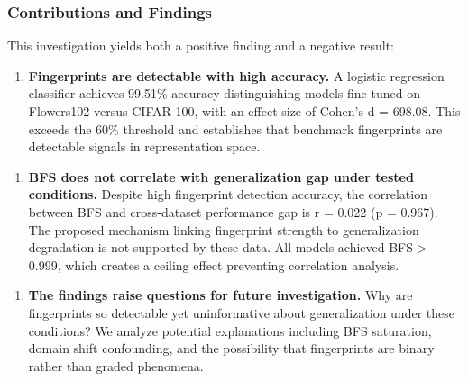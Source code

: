 \subsubsection{Contributions and Findings}

This investigation yields both a positive finding and a negative result:

\begin{enumerate}
\item \textbf{Fingerprints are detectable with high accuracy.} A logistic regression classifier achieves 99.51\% accuracy distinguishing models fine-tuned on Flowers102 versus CIFAR-100, with an effect size of Cohen's d = 698.08. This exceeds the 60\% threshold and establishes that benchmark fingerprints are detectable signals in representation space.
\end{enumerate}

\begin{enumerate}
\item \textbf{BFS does not correlate with generalization gap under tested conditions.} Despite high fingerprint detection accuracy, the correlation between BFS and cross-dataset performance gap is r = 0.022 (p = 0.967). The proposed mechanism linking fingerprint strength to generalization degradation is not supported by these data. All models achieved BFS > 0.999, which creates a ceiling effect preventing correlation analysis.
\end{enumerate}

\begin{enumerate}
\item \textbf{The findings raise questions for future investigation.} Why are fingerprints so detectable yet uninformative about generalization under these conditions? We analyze potential explanations including BFS saturation, domain shift confounding, and the possibility that fingerprints are binary rather than graded phenomena.
\end{enumerate}


